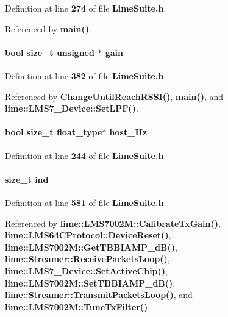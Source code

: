 Definition at line {\bf 274} of file {\bf Lime\+Suite.\+h}.



Referenced by {\bf main()}.

\paragraph[{gain}]{\setlength{\rightskip}{0pt plus 5cm}bool size\+\_\+t unsigned $\ast$ gain}\label{group__FN__HIGH__LVL_ga1275acc2013b13f44e8d43fcde951ef1}


Definition at line {\bf 382} of file {\bf Lime\+Suite.\+h}.



Referenced by {\bf Change\+Until\+Reach\+R\+S\+S\+I()}, {\bf main()}, and {\bf lime\+::\+L\+M\+S7\+\_\+\+Device\+::\+Set\+L\+P\+F()}.

\paragraph[{host\+\_\+\+Hz}]{\setlength{\rightskip}{0pt plus 5cm}bool size\+\_\+t {\bf float\+\_\+type}$\ast$ host\+\_\+\+Hz}\label{group__FN__HIGH__LVL_gaaa9184e2d61bf9dd267f76bb5db90d50}


Definition at line {\bf 244} of file {\bf Lime\+Suite.\+h}.

\paragraph[{ind}]{\setlength{\rightskip}{0pt plus 5cm}size\+\_\+t ind}\label{group__FN__HIGH__LVL_ga454e87c3d8b7400aa865dc281f39c409}


Definition at line {\bf 581} of file {\bf Lime\+Suite.\+h}.



Referenced by {\bf lime\+::\+L\+M\+S7002\+M\+::\+Calibrate\+Tx\+Gain()}, {\bf lime\+::\+L\+M\+S64\+C\+Protocol\+::\+Device\+Reset()}, {\bf lime\+::\+L\+M\+S7002\+M\+::\+Get\+T\+B\+B\+I\+A\+M\+P\+\_\+d\+B()}, {\bf lime\+::\+Streamer\+::\+Receive\+Packets\+Loop()}, {\bf lime\+::\+L\+M\+S7\+\_\+\+Device\+::\+Set\+Active\+Chip()}, {\bf lime\+::\+L\+M\+S7002\+M\+::\+Set\+T\+B\+B\+I\+A\+M\+P\+\_\+d\+B()}, {\bf lime\+::\+Streamer\+::\+Transmit\+Packets\+Loop()}, and {\bf lime\+::\+L\+M\+S7002\+M\+::\+Tune\+Tx\+Filter()}.

